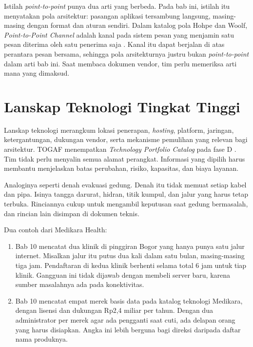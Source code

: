 \begin{pendalaman}[title={Pendalaman Teknis (opsional): Dua Arti Point-to-Point}]
  Istilah \textit{point-to-point} punya dua arti yang berbeda. Pada bab ini, istilah itu menyatakan pola arsitektur:
  pasangan aplikasi tersambung langsung, masing-masing dengan format dan aturan sendiri. Dalam katalog pola Hohpe dan
  Woolf, \textit{Point-to-Point Channel} adalah kanal pada sistem pesan yang menjamin satu pesan diterima oleh satu
  penerima saja \cite{hohpe2003}. Kanal itu dapat berjalan di atas perantara pesan bersama, sehingga pola
  arsitekturnya justru bukan \textit{point-to-point} dalam arti bab ini. Saat membaca dokumen vendor, tim perlu
  memeriksa arti mana yang dimaksud.
\end{pendalaman}

\section{Lanskap Teknologi Tingkat Tinggi}

Lanskap teknologi merangkum lokasi penerapan, \textit{hosting}, platform, jaringan, ketergantungan, dukungan vendor, serta
mekanisme pemulihan yang relevan bagi arsitektur. TOGAF menempatkan \textit{Technology Portfolio Catalog} pada fase D
\cite{togaf10}. Tim tidak perlu menyalin semua alamat perangkat. Informasi yang dipilih harus membantu menjelaskan batas
perubahan, risiko, kapasitas, dan biaya layanan.

Analoginya seperti denah evakuasi gedung. Denah itu tidak memuat setiap kabel dan pipa. Isinya tangga darurat, hidran,
titik kumpul, dan jalur yang harus tetap terbuka. Rinciannya cukup untuk mengambil keputusan saat gedung bermasalah,
dan rincian lain disimpan di dokumen teknis.

Dua contoh dari Medikara Health:

\begin{enumerate}
  \item Bab 10 mencatat dua klinik di pinggiran Bogor yang hanya punya satu jalur internet. Misalkan jalur itu putus dua kali
        dalam satu bulan, masing-masing tiga jam. Pendaftaran di kedua klinik berhenti selama total 6 jam untuk tiap klinik.
        Gangguan ini tidak dijawab dengan membeli server baru, karena sumber masalahnya ada pada konektivitas.
  \item Bab 10 mencatat empat merek basis data pada katalog teknologi Medikara, dengan lisensi dan dukungan Rp2,4 miliar per
        tahun. Dengan dua administrator per merek agar ada pengganti saat cuti, ada delapan orang yang harus disiapkan. Angka
        ini lebih berguna bagi direksi daripada daftar nama produknya.
\end{enumerate}

